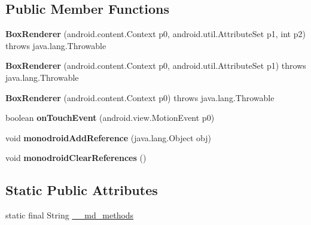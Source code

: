 \subsection*{Public Member Functions}
\begin{DoxyCompactItemize}
\item 
\mbox{\label{classmd5b60ffeb829f638581ab2bb9b1a7f4f3f_1_1BoxRenderer_aed7df0c4a87dc8a3d6e9de801d7dc37a}} 
{\bfseries Box\+Renderer} (android.\+content.\+Context p0, android.\+util.\+Attribute\+Set p1, int p2)  throws java.\+lang.\+Throwable 	
\item 
\mbox{\label{classmd5b60ffeb829f638581ab2bb9b1a7f4f3f_1_1BoxRenderer_a6500633c0eb2247796670cf8d19b41c0}} 
{\bfseries Box\+Renderer} (android.\+content.\+Context p0, android.\+util.\+Attribute\+Set p1)  throws java.\+lang.\+Throwable 	
\item 
\mbox{\label{classmd5b60ffeb829f638581ab2bb9b1a7f4f3f_1_1BoxRenderer_a2b1771eeb58746c23b513587c18ea9de}} 
{\bfseries Box\+Renderer} (android.\+content.\+Context p0)  throws java.\+lang.\+Throwable 	
\item 
\mbox{\label{classmd5b60ffeb829f638581ab2bb9b1a7f4f3f_1_1BoxRenderer_a7dbb553b416a3c1e05c3c31699665a75}} 
boolean {\bfseries on\+Touch\+Event} (android.\+view.\+Motion\+Event p0)
\item 
\mbox{\label{classmd5b60ffeb829f638581ab2bb9b1a7f4f3f_1_1BoxRenderer_a2c691e6eae3cfe1b2cfe9fbee3e51baf}} 
void {\bfseries monodroid\+Add\+Reference} (java.\+lang.\+Object obj)
\item 
\mbox{\label{classmd5b60ffeb829f638581ab2bb9b1a7f4f3f_1_1BoxRenderer_a2f64a02b513057089e1099ba75855aa2}} 
void {\bfseries monodroid\+Clear\+References} ()
\end{DoxyCompactItemize}
\subsection*{Static Public Attributes}
\begin{DoxyCompactItemize}
\item 
static final String \hyperlink{classmd5b60ffeb829f638581ab2bb9b1a7f4f3f_1_1BoxRenderer_a5d93612d5b0a73e4f90ab9f50db54f92}{\+\_\+\+\_\+md\+\_\+methods}
\end{DoxyCompactItemize}
